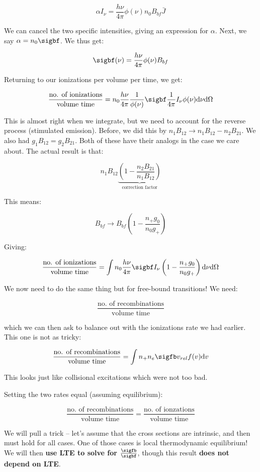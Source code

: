 \documentclass{article}
\begin{document}
$$
\alpha I_\nu = \frac{h\nu}{4\pi} \phi(\nu) n_0 B_{bf} \bar{J}
$$

We can cancel the two specific intensities, giving an expression for $\alpha$. Next, we say $\alpha = n_0 \sigbf$. We thus get:

$$
\sigbf (\nu) = \frac{h\nu}{4\pi} \phi(\nu)  B_{bf}
$$

Returning to our ionizations per volume per time, we get:

$$
\frac{\text{no. of ionizations}}{\text{volume} \text{ time}} = n_0 \frac{h\nu}{4\pi} \frac{1}{\phi(\nu)}  \sigbf \frac{1}{4\pi} I_\nu \phi(\nu) \mathrm{d}\nu \mathrm{d}\Omega
$$

This is almost right when we integrate, but we need to account for the reverse process (stimulated emission). Before, we did this by $n_1 B_{12} \rightarrow n_1 B_{12} - n_2 B_{21}$. We also had $g_1 B_{12} = g_2 B_{21}$. Both of these have their analogs in the case we care about. The actual result is that:

$$
n_1 B_{12} \underbrace{\left(1 - \frac{n_2 B_{21}}{n_1 B_{12}}\right)}_\text{correction factor}
$$

This means:

$$
B_{bf} \rightarrow B_{bf}\left(1 - \frac{n_+ g_{0}}{n_0 g_+}\right)
$$

Giving:

$$
\frac{\text{no. of ionizations}}{\text{volume} \text{ time}} = \int n_0 \frac{h\nu}{4\pi}  \sigbf  I_\nu \left(1 - \frac{n_+ g_{0}}{n_0 g_+}\right) \mathrm{d}\nu \mathrm{d}\Omega
$$

We now need to do the same thing but for free-bound transitions! We need:

$$
\frac{\text{no. of recombinations}}{\text{volume} \text{ time}} 
$$

which we can then ask to balance out with the ionizations rate we had earlier. This one is not as tricky:

$$
\frac{\text{no. of recombinations}}{\text{volume} \text{ time}} = \int n_+ n_e \sigfb v_{rel} f(v) \mathrm{d}v
$$

This looks just like collisional excitations which were not too bad. 

Setting the two rates equal (assuming equilibrium):

$$
\frac{\text{no. of recombinations}}{\text{volume} \text{ time}} = \frac{\text{no. of ionzations}}{\text{volume} \text{ time}}
$$

We will pull a trick -- let's assume that the cross sections are intrinsic, and then must hold for all cases. One of those cases is local thermodynamic equilibrium! We will then \textbf{use LTE to solve for} $\frac{\sigfb}{\sigbf}$, though this result \textbf{does not depend on LTE}.
\end{document}
